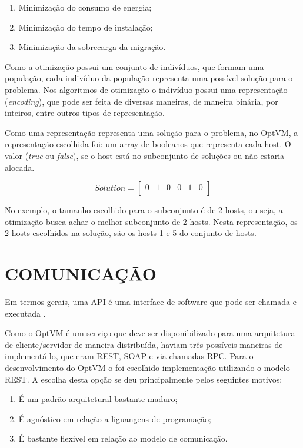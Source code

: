 \begin{enumerate}
\item Minimização do consumo de energia;
\item Minimização do tempo de instalação;
\item Minimização da sobrecarga da migração.
\end{enumerate}

Como a otimização possui um conjunto de indivíduos, que formam uma população, cada indivíduo
da população representa uma possível solução para o problema.  Nos algoritmos de 
otimização o indivíduo possui uma representação (\textit{encoding}), que pode ser feita
de diversas maneiras, de maneira binária, por inteiros, entre outros tipos de representação.

Como uma representação representa uma solução para o problema, no OptVM, a 
representação escolhida foi: um array de booleanos que representa cada host.
O valor (\textit{true} ou \textit{false}), se o host está no subconjunto de soluções 
ou não estaria alocada.

\[
  Solution=
  \left[{\begin{array}{cccccc}
    0 & 1 & 0 & 0 & 1 & 0 \\
  \end{array}}\right
  ]
\]

No exemplo, o tamanho escolhido para o subconjunto é de 2 hosts, ou seja, 
a otimização busca achar o melhor subconjunto de 2 hosts. Nesta representação,
os 2 hosts escolhidos na solução, são os hosts 1 e 5 do conjunto de hosts.

\section{COMUNICAÇÃO}
Em termos gerais, uma API é uma interface de software que pode ser chamada e executada \cite{eizinger}. 

Como o OptVM é um serviço que deve ser disponibilizado para uma arquitetura de 
cliente/servidor de maneira distribuída, haviam três possíveis maneiras de implementá-lo, 
que eram REST, SOAP e via chamadas RPC. 
Para o desenvolvimento do OptVM o foi escolhido implementação utilizando o modelo REST. 
A escolha desta opção se deu principalmente pelos seguintes motivos:

\begin{enumerate}
\item É um padrão arquitetural bastante maduro;
\item É agnóstico em relação a liguangens de programação;
\item É bastante flexivel em relação ao modelo de comunicação.
\end{enumerate}


